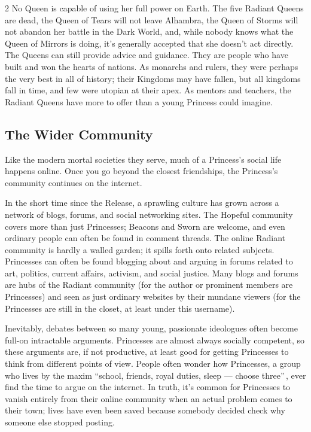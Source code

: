 \begin{multicols}{2}
No Queen is capable of using her full power on Earth. The five Radiant Queens are dead, the Queen of Tears will not leave Alhambra, the Queen of Storms will not abandon her battle in the Dark World, and, while nobody knows what the Queen of Mirrors is doing, it's generally accepted that she doesn't act directly. The Queens can still provide advice and guidance. They are people who have built and won the hearts of nations. As monarchs and rulers, they were perhaps the very best in all of history; their Kingdoms may have fallen, but all kingdoms fall in time, and few were utopian at their apex. As mentors and teachers, the Radiant Queens have more to offer than a young Princess could imagine.

\subsection*{The Wider Community}

Like the modern mortal societies they serve, much of a Princess's social life happens online. Once you go beyond the closest friendships, the Princess's community continues on the internet. 

In the short time since the Release, a sprawling culture has grown across a network of blogs, forums, and social networking sites. The Hopeful community covers more than just Princesses; Beacons and Sworn are welcome, and even ordinary people can often be found in comment threads. The online Radiant community is hardly a walled garden; it spills forth onto related subjects. Princesses can often be found blogging about and arguing in forums related to art, politics, current affairs, activism, and social justice. Many blogs and forums are hubs of the Radiant community (for the author or prominent members are Princesses) and seen as just ordinary websites by their mundane viewers (for the Princesses are still in the closet, at least under this username). 

Inevitably, debates between so many young, passionate ideologues often become full-on intractable arguments. Princesses are almost always socially competent, so these arguments are, if not productive, at least good for getting Princesses to think from different points of view. People often wonder how Princesses, a group who lives by the maxim \textquotedblleft school, friends, royal duties, sleep — choose three\textquotedblright\,, ever find the time to argue on the internet. In truth, it's common for Princesses to vanish entirely from their online community when an actual problem comes to their town; lives have even been saved because somebody decided check why someone else stopped posting. 


\end{multicols}
